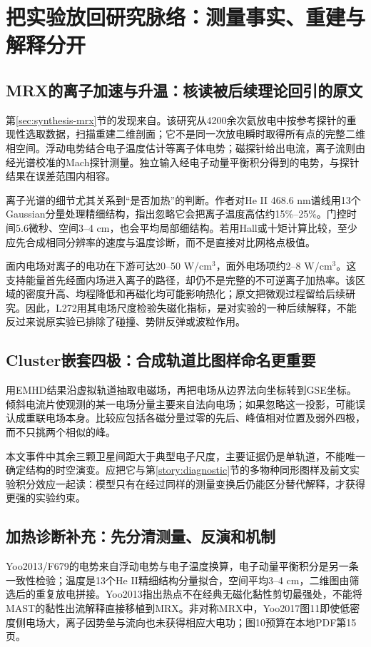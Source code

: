 \documentclass[UTF8,a4paper,11pt,openany,fontset=fandol]{ctexbook}
\begin{document}
\section{把实验放回研究脉络：测量事实、重建与解释分开}
\subsection{MRX的离子加速与升温：核读被后续理论回引的原文}
第\ref{sec:synthesis-mrx}节的发现来自\citet{Yoo2013}。该研究从4200余次氦放电中按参考探针的重现性选取数据，扫描重建二维剖面；它不是同一次放电瞬时取得所有点的完整二维相空间。浮动电势结合电子温度估计等离子体电势；磁探针给出电流，离子流则由经光谱校准的Mach探针测量。独立输入经电子动量平衡积分得到的电势，与探针结果在误差范围内相容。

离子光谱的细节尤其关系到“是否加热”的判断。作者对He II 468.6 nm谱线用13个Gaussian分量处理精细结构，指出忽略它会把离子温度高估约15\%--25\%。门控时间5.6微秒、空间3--4 cm，也会平均局部细结构。若用Hall或十矩计算比较，至少应先合成相同分辨率的速度与温度诊断，而不是直接对比网格点极值。

面内电场对离子的电功在下游可达20--50 W/cm$^3$，面外电场项约2--8 W/cm$^3$。这支持能量首先经面内场进入离子的路径，却仍不是完整的不可逆离子加热率。该区域的密度升高、均程降低和再磁化均可能影响热化；原文把微观过程留给后续研究。因此，L272用其电场尺度检验失磁化指标，是对实验的一种后续解释，不能反过来说原实验已排除了碰撞、势阱反弹或波粒作用。\citep{Yoo2013,L272}

\subsection{Cluster嵌套四极：合成轨道比图样命名更重要}
\citet{L213}用EMHD结果沿虚拟轨道抽取电磁场，再把电场从边界法向坐标转到GSE坐标。倾斜电流片使观测的某一电场分量主要来自法向电场；如果忽略这一投影，可能误认成重联电场本身。比较应包括各磁分量过零的先后、峰值相对位置及弱外四极，而不只挑两个相似的峰。

本文事件中其余三颗卫星间距大于典型电子尺度，主要证据仍是单轨道，不能唯一确定结构的时空演变。应把它与第\ref{story:diagnostic}节的多物种同形图样及前文实验积分效应一起读：模型只有在经过同样的测量变换后仍能区分替代解释，才获得更强的实验约束。


\subsection{加热诊断补充：先分清测量、反演和机制}
Yoo2013/F679的电势来自浮动电势与电子温度换算，电子动量平衡积分是另一条一致性检验；温度是13个He II精细结构分量拟合，空间平均3--4 cm，二维图由筛选后的重复放电拼接。Yoo2013指出热点不在经典无磁化黏性剪切最强处，不能将MAST的黏性出流解释直接移植到MRX。非对称MRX中，Yoo2017图11即使低密度侧电场大，离子因势垒与流向也未获得相应大电功；图10预算在本地PDF第15页。\citep{Yoo2013,F679,Yoo2017Heating}
\end{document}
